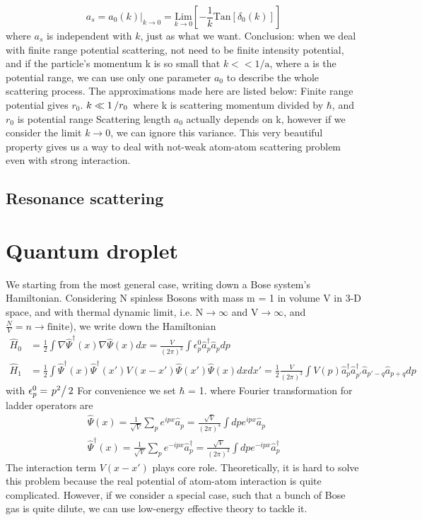 \begin{equation}
a_s=a_0(k)|_{k\to0}=\underset{k\to0}{\text{Lim}}\left[-\frac{1}{k}\text{Tan}\left[\delta _0(k)\right]\right]
\end{equation}
where $a_s$ is independent with $k$, just as what we want.
Conclusion: when we deal with finite range potential scattering, not need to be finite intensity potential, and if the particle's momentum k is so small that $k<<\text{1/a}$, where a is the potential range, we can use only one parameter $a_0$ to describe the whole scattering process. The approximations made here are listed below:
Finite range potential gives $r_0$.
$k\ll 1\left/r_0 \right.$ where k is scattering momentum divided by $\hbar$, and $r_0$ is potential range
Scattering length $a_0$ actually depends on k, however if we consider the limit $k\to 0$, we can ignore this variance.
This very beautiful property gives us a way to deal with not-weak atom-atom scattering problem even with strong interaction.

\subsection{Resonance scattering}


\section{Quantum droplet}

We starting from the most general case, writing down a Bose system's Hamiltonian. Considering N spinless Bosons with mass m = 1 in volume V in 3-D space, and with thermal dynamic limit, i.e. N$\to \infty $ and V$\to
\infty $, and $\frac{N}{V}=n\to \text{finite}$), we write down the Hamiltonian
\begin{equation}
\begin{split}
\hat{H}_0&=\frac{1}{2}\int\nabla\hat{\Psi}^\dagger(x)\nabla\hat{\Psi }(x)dx=\frac{V}{(2\pi)^3}\int\epsilon_p^0\hat{a}_p^\dagger\hat{a}_pdp\\
\hat{H}_1&=\frac{1}{2}\int\hat{\Psi}^\dagger(x)\hat{\Psi}^\dagger(x')V(x-x')\hat{\Psi}(x')\hat{\Psi}(x)dxdx'=\frac{1}{2}\frac{V}{(2\pi)^3}\int V(p)\hat{a}_p^\dagger\hat{a}_{p'}^\dagger\hat{a}_{p'-q}\hat{a}_{p+q}dp
\end{split}
\end{equation}
with $\epsilon _p^0=\left.p^2\right/2$
For convenience we set $\hbar $ = 1.
where Fourier transformation for ladder operators are
\begin{equation}
\begin{split}
\hat{\Psi}(x)=\frac{1}{\sqrt{V}}\sum_{p}e^{ipx}\hat{a}_p=\frac{\sqrt{V}}{(2\pi)^3}\int dp e^{i p x}\hat{a}_p\\
\hat{\Psi}^\dagger(x)=\frac{1}{\sqrt{V}}\sum_p e^{-i p x}\hat{a}_p^\dagger=\frac{\sqrt{V}}{(2\pi)^3}\int dp e^{-i p x}\hat{a}_p^\dagger
\end{split}
\end{equation}
The interaction term $V(x-x')$ plays core role. Theoretically, it is hard to solve this problem because the real potential of atom-atom interaction is quite complicated. However, if we consider a special case, such that a bunch of Bose gas is quite dilute, we can use low-energy effective theory to tackle it.

